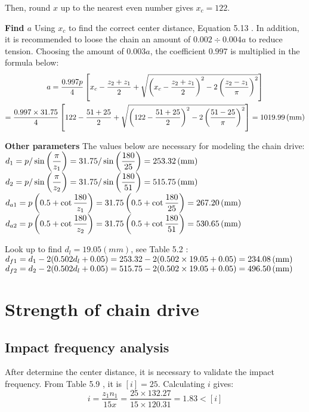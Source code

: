 Then, round $ x $ up to the nearest even number gives $ x_c = 122$.

\textbf{Find $ a $}
Using $ x_c $ to find the correct center distance, Equation 5.13 \cite{tk1}. In addition, it is recommended to loose the chain an amount of $ 0.002\div0.004 a $ to reduce tension. Choosing the amount of $ 0.003a $, the coefficient $ 0.997 $ is multiplied in the formula below:
\begin{multline*}
	a = \dfrac{0.997p}{4}\left[x_c-\dfrac{z_2+z_1}{2}+\sqrt{\left(x_c-\dfrac{z_2+z_1}{2}\right)^2-2\left(\dfrac{z_2-z_1}{\pi}\right)^2}\right]\\ = \dfrac{0.997\times31.75}{4}\left[122-\dfrac{51+25}{2}+\sqrt{\left(122-\dfrac{51+25}{2}\right)^2-2\left(\dfrac{51-25}{\pi}\right)^2}\right]= 1019.99 \, (\mathrm{mm})
\end{multline*}

\textbf{Other parameters} The values below are necessary for modeling the chain drive:\\ 
$ d_1 = p/\sin\left(\dfrac{\pi}{z_1}\right) = 31.75/\sin\left(\dfrac{180}{25}\right) = 253.32\, (\mathrm{mm})$\\
$ d_2 = p/\sin\left(\dfrac{\pi}{z_2}\right) = 31.75/\sin\left(\dfrac{180}{51}\right) = 515.75\, (\mathrm{mm})$\\
$ d_{a1} = p\left( 0.5 + \cot \dfrac{180}{z_1} \right) = 31.75 \left( 0.5 + \cot \dfrac{180}{25} \right) = 267.20 \, (\mathrm{mm})$\\
$ d_{a2} = p\left( 0.5 + \cot \dfrac{180}{z_2} \right) = 31.75 \left( 0.5 + \cot \dfrac{180}{51} \right) =  530.65 \, (\mathrm{mm})$

Look up to find $ d_l = 19.05 \unit{(mm)} $, see Table 5.2 \cite{tk1}:\\
$ d_{f1} = d_1 - 2(0.502d_l+0.05) = 253.32 - 2(0.502\times 19.05+0.05) = 234.08 \, (\mathrm{mm})$\\
$ d_{f2} = d_2 - 2(0.502d_l+0.05) = 515.75 - 2(0.502\times 19.05+0.05) = 496.50 \, (\mathrm{mm})$

\section{Strength of chain drive}
\subsection{Impact frequency analysis}
After determine the center distance, it is necessary to validate the impact frequency. From Table 5.9 \cite{tk1}, it  is $ [i]=25 $. Calculating $ i $ gives:
\[i=\dfrac{z_1n_1}{15x}=\dfrac{25\times 132.27}{15\times 120.31}=1.83<[i]\]

